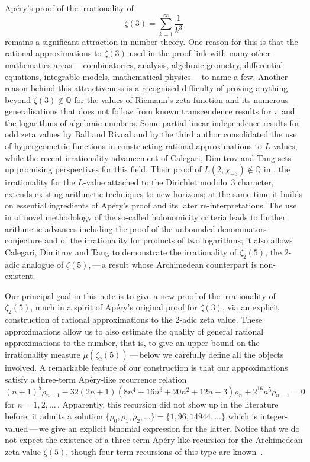 \documentclass[12pt]{article}
\theoremstyle{remark}
\numberwithin{equation}{section}
\begin{document}
Ap\'ery's proof \cite{Ape1979} of the irrationality of
\[
\zeta(3)=\sum_{k=1}^\infty\frac1{k^3}
\]
remains a significant attraction in number theory.
One reason for this is that the rational approximations to $\zeta(3)$ used in the proof link with many other mathematics areas\,---\,combinatorics, analysis, algebraic geometry, differential equations, integrable models, mathematical physics\,---\,to name a few.
Another reason behind this attractiveness is a recognised difficulty of proving anything beyond $\zeta(3)\notin\mathbb Q$ for the values of Riemann's zeta function and its numerous generalisations that does not follow from known transcendence results for $\pi$ and the logarithms of algebraic numbers.
Some partial linear independence results for odd zeta values by Ball and Rivoal \cite{BR2001,Riv2000} and by the third author \cite{Zud2001} consolidated the use of hypergeometric functions in constructing rational approximations to $L$-values,
while the recent irrationality advancement \cite{CDT2024+} of Calegari, Dimitrov and Tang sets up promising perspectives for this field.
Their proof of $L(2,\chi_{-3})\notin\mathbb Q$ in \cite{CDT2024+}, the irrationality for the $L$-value attached to the Dirichlet modulo~3 character, extends existing arithmetic techniques to new horizons; at the same time it builds on essential ingredients of Ap\'ery's proof and its later re-interpretations.
The use in \cite{CDT2024+} of novel methodology of the so-called holonomicity criteria leads to further arithmetic advances including the proof of the unbounded denominators conjecture \cite{CDT2025} and of the irrationality for products of two logarithms; it also allows Calegari, Dimitrov and Tang \cite{CDT2020+,CDT2025+} to demonstrate the irrationality of $\zeta_2(5)$, the $2$-adic analogue of $\zeta(5)$,\,---\,a result whose Archimedean counterpart is non-existent. 

Our principal goal in this note is to give a new proof of the irrationality of $\zeta_2(5)$, much in a spirit of Ap\'ery's original proof for $\zeta(3)$, via an explicit construction of rational approximations to the 2-adic zeta value. These approximations allow us to also estimate the quality of general rational approximations to the number, that is, to give an upper bound on the irrationality measure $\mu(\zeta_2(5))$\,---\,below we carefully define all the objects involved.
A remarkable feature of our construction is that our approximations satisfy a three-term Ap\'ery-like recurrence relation
\begin{equation}
(n+1)^5\rho_{n+1} - 32(2n+1)(8n^4+16n^3+20n^2+12n+3)\rho_n + 2^{16}n^5\rho_{n-1} = 0
\label{eq:rec}
\end{equation}
for $n=1,2,\dots$\,. Apparently, this recursion did not show up in the literature before; it admits a solution $\{\rho_0,\rho_1,\rho_2,\dots\}=\{1,96,14944,\dots\}$ which is integer-valued\,---\,we give an explicit binomial expression for the latter.
Notice that we do not expect the existence of a three-term Ap\'ery-like recursion for the Archimedean zeta value $\zeta(5)$, though four-term recursions of this type are known~\cite{BZ2022+}.
\end{document}
